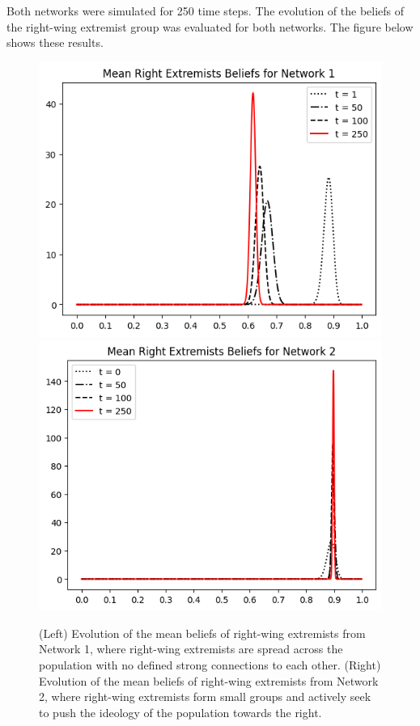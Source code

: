 \documentclass[11pt]{article}
\begin{document}
Both networks were simulated for 250 time steps. The evolution of the beliefs of the right-wing extremist group was evaluated for both networks. The figure below shows these results.

\begin{figure}[h]
    \centering
    \includegraphics[scale=0.5]{images/Mean right extremist beliefs from spread right extremists.png}
    \hspace{1cm}
    \includegraphics[scale=0.5]{images/Mean right extremist beliefs from political party simulation.png}
    \caption{(Left) Evolution of the mean beliefs of right-wing extremists from Network 1, where right-wing extremists are spread across the population with no defined strong connections to each other. (Right) Evolution of the mean beliefs of right-wing extremists from Network 2, where right-wing extremists form small groups and actively seek to push the ideology of the population towards the right. }
\end{figure}
\end{document}
